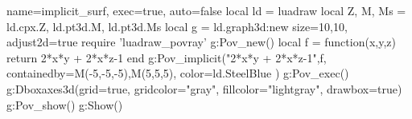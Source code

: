 \documentclass[border=5pt]{standalone}%
\begin{document}
\begin{luadraw}{name=implicit_surf, exec=true, auto=false}
local ld = luadraw
local Z, M, Ms = ld.cpx.Z, ld.pt3d.M, ld.pt3d.Ms
local g = ld.graph3d:new{ size={10,10}, adjust2d=true }
require 'luadraw_povray'
g:Pov_new()
local f = function(x,y,z) return 2*x*y + 2*x*z-1 end
g:Pov_implicit("2*x*y + 2*x*z-1",f,{ containedby={M(-5,-5,-5),M(5,5,5)}, 
    color=ld.SteelBlue })
g:Pov_exec()
g:Dboxaxes3d({grid=true, gridcolor="gray", fillcolor="lightgray", drawbox=true})
g:Pov_show()
g:Show()
\end{luadraw}
\end{document}
